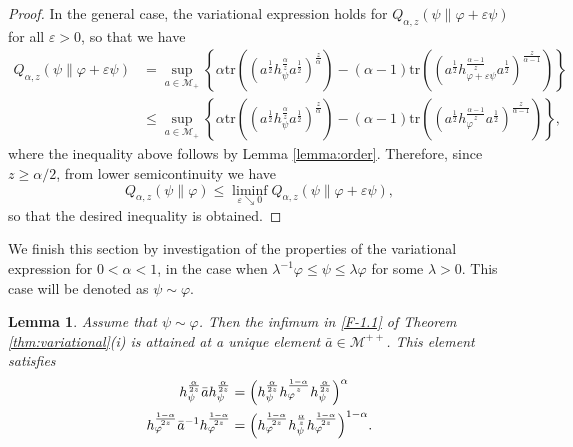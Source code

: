 \documentclass[12pt]{article}
\newtheorem{lemma}[theorem]{Lemma}
\theoremstyle{definition}
\theoremstyle{remark}
\numberwithin{equation}{section}
\def\Me{\mathcal M}
\def\Tr{\mathrm{tr}}
\def\ffi{\varphi}
\begin{document}
\begin{proof}
In the general case, the variational expression holds for
$Q_{\alpha,z}(\psi\|\varphi+\varepsilon\psi)$  for all $\varepsilon>0$, so that we have
\begin{align*}
Q_{\alpha,z}(\psi\|\varphi+\varepsilon\psi)&=\sup_{a\in \Me_+} \left\{\alpha
\Tr\left((a^{\frac12}h_\psi^{\frac{\alpha}{z}}a^{\frac12})^{\frac{z}{\alpha}}\right)
-(\alpha-1)\Tr\left((a^{\frac12}h_{\varphi+\varepsilon \psi}^{\frac{\alpha-1}{z}}
a^{\frac12})^{\frac{z}{\alpha-1}}\right)\right\}\\
&\le\sup_{a\in \Me_+} \left\{\alpha
\Tr\left((a^{\frac12}h_\psi^{\frac{\alpha}{z}}a^{\frac12})^{\frac{z}{\alpha}}\right)-(\alpha-1)
\Tr\left((a^{\frac12}h_\varphi^{\frac{\alpha-1}{z}}a^{\frac12})^{\frac{z}{\alpha-1}}\right)
\right\},
\end{align*}
where the inequality above follows by Lemma \ref{lemma:order}. Therefore,
{\color{red}since $z\ge\alpha/2$, from lower semicontinuity \cite[Theorem 2(iv)]{kato2023onrenyi}
we have}
\[
Q_{\alpha,z}(\psi\|\varphi)\le \liminf_{\varepsilon\searrow 0}
Q_{\alpha,z}(\psi\|\varphi+\varepsilon \psi),
\]
so that the desired inequality is obtained.
\end{proof}

We finish this section by investigation of the properties of the variational expression for
$0<\alpha<1$, in the case when $\lambda^{-1}\ffi\le \psi\le \lambda \ffi$ for some
$\lambda>0$. This case will be denoted as $\psi\sim \ffi$. 

\begin{lemma}\label{lemma:variational_majorized}
Assume that $\psi\sim\ffi$. Then the infimum in \eqref{F-1.1} of Theorem \ref{thm:variational}(i) is
attained at a unique element $\bar a\in \Me^{++}$. This element satisfies
\begin{align}
h_\psi^{\alpha\over2z}\bar ah_\psi^{\alpha\over2z}
&=\Bigl(h_\psi^{\alpha\over2z}h_\ffi^{1-\alpha\over z}h_\psi^{\alpha\over2z}\Bigr)^\alpha
\label{eq:minimizer1}\\
h_\ffi^{1-\alpha\over2z}\bar a^{-1}h_\ffi^{1-\alpha\over2z}
&=\Bigl(h_\ffi^{1-\alpha\over2z}h_\psi^{\alpha\over
z}h_\ffi^{1-\alpha\over2z}\Bigr)^{1-\alpha}.
\label{eq:minimizer2}
\end{align}
\end{lemma}
\end{document}
